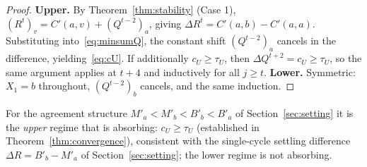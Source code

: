\documentclass[letterpaper]{article} %
\theoremstyle{definition}
\theoremstyle{remark}
\begin{document}
\begin{proof}
\textbf{Upper.}  By Theorem~\ref{thm:stability} (Case 1), $(R^t)_v = C'(a,v)+(Q^{t-2})_a$, giving $\Delta R^t = C'(a,b)-C'(a,a)$.  Substituting into~\eqref{eq:minsumQ}, the constant shift $(Q^{t-2})_a$ cancels in the difference, yielding~\eqref{eq:cU}.  If additionally $c_U \geq \tau_U$, then $\Delta Q^{t+2} = c_U \geq \tau_U$, so the same argument applies at $t+4$ and inductively for all $j \geq t$.  \textbf{Lower.}  Symmetric: $X_1=b$ throughout, $(Q^{t-2})_b$ cancels, and the same induction. \qedhere
\end{proof}
\noindent For the agreement structure $M'_a < M'_b < B'_b < B'_a$ of Section~\ref{sec:setting} it is the \emph{upper} regime that is absorbing: $c_U \geq \tau_U$ (established in Theorem~\ref{thm:convergence}), consistent with the single-cycle settling difference $\Delta R = B'_b - M'_a$ of Section~\ref{sec:setting}; the lower regime is not absorbing.
\end{document}
